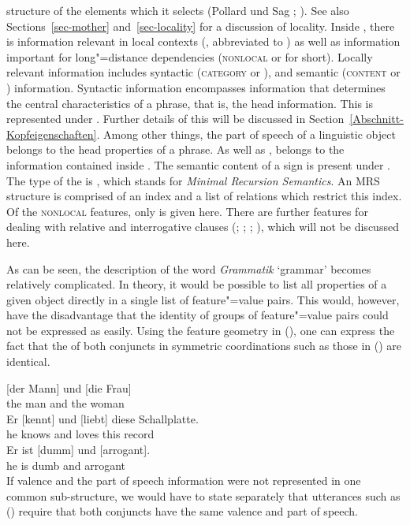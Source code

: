 structure of the elements which it selects (Pollard und Sag \citeyear[--145]{ps};
\citeyear[]{ps2}). See also Sections~\ref{sec-mother} and~\ref{sec-locality} for a
discussion of locality. Inside \synsem, there is information relevant in local contexts (\local,
abbreviated to \loc) as well as information important for long"=distance dependencies
(\textsc{nonlocal} or \nonloc for short). Locally relevant information includes syntactic
(\textsc{category} or \cat), and semantic (\textsc{content} or \cont) information. Syntactic
information encompasses information that determines the central characteristics of a phrase, that
is, the head information. This is represented under \head. Further details of this will be discussed in
 Section~\ref{Abschnitt-Kopfeigenschaften}. Among other things, the part of speech of a 
 linguistic object belongs to the head properties of a phrase. As well as \head, \subcat belongs to the information contained inside \cat. The semantic content
 of a sign is present under \cont. The type of the \contv is , which stands for \emph{Minimal Recursion
Semantics}\indexmrs \citep*{CFPS2005a}. An MRS structure is comprised of an index and a list of
relations which restrict this index. Of the \textsc{nonlocal} features, only \slasch is given here. There are further features for dealing with relative
and interrogative clauses (\citealp{ps2}; \citealp{Sag97a};
\citealp{GSag2000a-u}; \citealp{Holler2005a-u}), which will not be discussed here.

As can be seen, the description of the word \emph{Grammatik} `grammar' becomes relatively complicated. In theory, it would be possible to list all properties
of a given object directly in a single list of feature"=value pairs. This would, however, have the disadvantage that the identity of groups of feature"=value pairs could not be
expressed as easily. Using the feature geometry in (), one can express the fact that the \catvs of both conjuncts in symmetric coordinations
such as those in () are identical.\label{Seite-HPSG-Koordination}

\eal
\ex 
\gll {}[der Mann] und [die Frau]\\
	 {}\spacebr{}the man and \spacebr{}the woman\\
\ex 
\gll Er [kennt] und [liebt] diese Schallplatte.\\
	 he \spacebr{}knows and \spacebr{}loves this record\\
\ex 
\gll Er ist [dumm] und [arrogant].\\
	he is \spacebr{}dumb and \spacebr{}arrogant\\
\zl
If valence and the part of speech information were not represented in one common sub-structure, we would
have to state separately that utterances such as () require that both
conjuncts have the same valence and part of speech.

